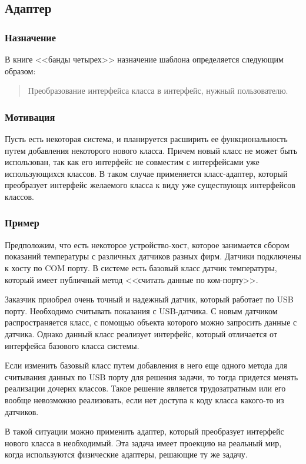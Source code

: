 \documentclass[10pt]{article}
\begin{document}
\subsection{Адаптер}
\subsubsection{Назначение}
В книге <<банды четырех>> назначение шаблона определяется
следующим образом:
\begin{quote}
Преобразование интерфейса класса в интерфейс, нужный пользователю.
\end{quote}

\subsubsection{Мотивация}
Пусть есть некоторая система, и планируется расширить ее функциональность
путем добавления некоторого нового класса. Причем новый класс не может быть
использован, так как его интерфейс не совместим с интерфейсами уже использующихся классов.
В таком случае применяется класс-адаптер, который преобразует интерфейс желаемого
класса к виду уже существующх интерфейсов классов.

\subsubsection{Пример}
Предположим, что есть некоторое устройство-хост, которое занимается сбором
показаний температуры с различных датчиков разных фирм. Датчики подключены к хосту
по COM порту. В системе есть базовый класс датчик температуры, который имеет публичный метод
<<считать данные по ком-порту>>.

Заказчик приобрел очень точный и надежный датчик, который работает по USB
порту. Необходимо считывать показания с USB-датчика. С новым датчиком распространяется класс,
с помощью объекта которого можно запросить данные с датчика. Однако данный класс
реализует интерфейс, который отличается от интерфейса базового класса системы.

Если изменить базовый класс путем добавления в него еще одного метода для считывания данных
по USB порту для решения задачи, то тогда придется менять реализации дочернх классов.
Такое решение является трудозатратным или его вообще невозможно реализовать,
если нет доступа к коду класса какого-то из датчиков.

В такой ситуации можно применить адаптер, который преобразует интерфейс нового класса в необходимый.
Эта задача имеет проекцию на реальный мир, когда используются физические адаптеры, решающие ту же задачу.
\end{document}
